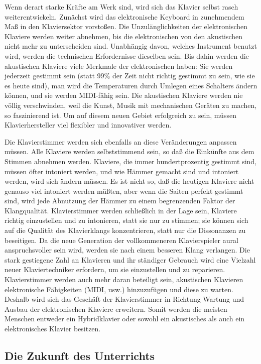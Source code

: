 Wenn derart starke Kräfte am Werk sind, wird sich das Klavier selbst rasch weiterentwickeln.
Zunächst wird das elektronische Keyboard in zunehmendem Maß in den Klaviersektor vorstoßen.
Die Unzulänglichkeiten der elektronischen Klaviere werden weiter abnehmen, bis die elektronischen von den akustischen nicht mehr zu unterscheiden sind.
Unabhängig davon, welches Instrument benutzt wird, werden die technischen Erfordernisse dieselben sein.
Bis dahin werden die akustischen Klaviere viele Merkmale der elektronischen haben: Sie werden jederzeit gestimmt sein (statt 99\% der Zeit nicht richtig gestimmt zu sein, wie sie es heute sind), man wird die Temperaturen durch Umlegen eines Schalters ändern können, und sie werden MIDI-fähig sein.
Die akustischen Klaviere werden nie völlig verschwinden, weil die Kunst, Musik mit mechanischen Geräten zu machen, so faszinierend ist.
Um auf diesem neuen Gebiet erfolgreich zu sein, müssen Klavierhersteller viel flexibler und innovativer werden.

Die Klavierstimmer werden sich ebenfalls an diese Veränderungen anpassen müssen.
Alle Klaviere werden selbststimmend sein, so daß die Einkünfte aus dem Stimmen abnehmen werden.
Klaviere, die immer hundertprozentig gestimmt sind, müssen öfter intoniert werden, und
wie Hämmer gemacht sind und intoniert werden, wird sich ändern müssen.
Es ist nicht so, daß die heutigen Klaviere nicht genauso viel intoniert werden müßten, aber wenn die Saiten perfekt gestimmt sind, wird jede Abnutzung der Hämmer zu einem begrenzenden Faktor der Klangqualität.
Klavierstimmer werden schließlich in der Lage sein, Klaviere richtig einzustellen und zu intonieren, statt sie nur zu stimmen; sie können sich auf die Qualität des Klavierklangs konzentrieren, statt nur die Dissonanzen zu beseitigen.
Da die neue Generation der vollkommeneren Klavierspieler aural anspruchsvoller sein wird, werden sie nach einem besseren Klang verlangen.
Die stark gestiegene Zahl an Klavieren und ihr ständiger Gebrauch wird eine Vielzahl neuer Klaviertechniker erfordern, um sie einzustellen und zu reparieren.
Klavierstimmer werden auch mehr daran beteiligt sein, akustischen Klavieren elektronische Fähigkeiten (MIDI, usw.) hinzuzufügen und diese zu warten.
Deshalb wird sich das Geschäft der Klavierstimmer in Richtung Wartung und Ausbau der elektronischen Klaviere erweitern.
Somit werden die meisten Menschen entweder ein Hybridklavier oder sowohl ein akustisches als auch ein elektronisches Klavier besitzen.
 

\subsection{Die Zukunft des Unterrichts}\hypertarget{c1iv6i}{}

